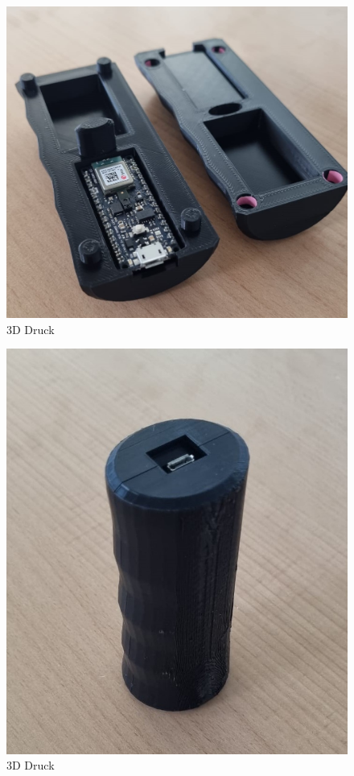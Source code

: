 \begin{minipage}[l]{0.49\textwidth}
  \begin{figure}[H]
    \begin{center}
      \includegraphics[width=1\linewidth]{content/images/3DPrint_open.jpeg}
      \caption{3D Druck}
    \end{center}
  \end{figure}
\end{minipage}
\begin{minipage}[r]{0.5\textwidth}
  \begin{figure}[H]
    \begin{center}
      \includegraphics[width=0.8\linewidth]{content/images/3DPrint_closed.jpeg}
      \caption{3D Druck}
    \end{center}
  \end{figure}
\end{minipage}